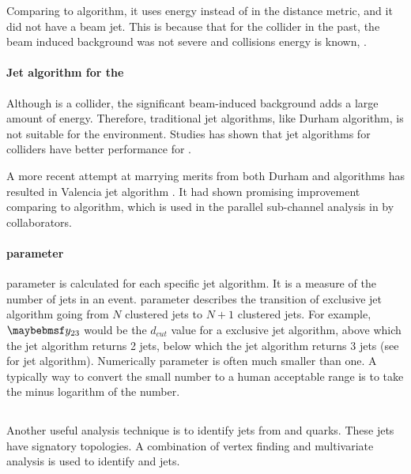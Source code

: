 Comparing to \kt algorithm, it uses energy instead of \pT in the distance metric, and it did not have a beam jet. This is because that for the \ee collider in the past, the beam induced background was not severe and collisions energy is known, \sqrtS.

\paragraph{Jet algorithm for the \CLIC}

Although \CLIC is a \ee collider, the significant beam-induced background adds a large amount of energy. Therefore, traditional \ee jet algorithms, like Durham algorithm, is not suitable for the \CLIC environment. Studies has shown that jet algorithms for \pp colliders have better performance for \CLIC \cite{Linssen:2012hp,LCD-Note-2010-006}.

A more recent attempt at marrying merits from both Durham and \kt algorithms has resulted in Valencia jet algorithm \cite{Boronat:2014hva}. It had shown promising improvement comparing to \kt algorithm, which is used in the parallel  \eeToHHbbbb  sub-channel analysis in  by collaborators.



\paragraph{\y{} parameter}
\label{sec:pandoraYparameter}
\y{} parameter is calculated for each specific jet algorithm. It is a measure of the number of jets in an event. \y{} parameter describes the transition of exclusive jet algorithm going from $N$ clustered jets to $N\!+\!1$ clustered jets. For example, $\y{23}$ would be the $d_{cut}$ value for a exclusive jet algorithm, above which the jet algorithm returns 2 jets, below which the jet algorithm returns 3 jets (see  for jet algorithm). Numerically \y{} parameter is often much smaller than one. A typically way to convert the small number to a human acceptable range is to take the minus logarithm of the number.


\subsection{\lcfiplus}
\label{sec:pandoraLCFI}
Another useful analysis technique is to identify jets from \Pbottom and \Pcharm quarks. These jets have signatory topologies. A combination of vertex finding and multivariate analysis is used to identify \Pbottom and \Pcharm jets.

